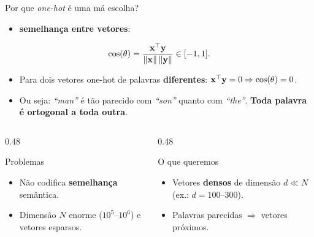 \begin{frame}{Por que \textit{one-hot} é uma má escolha?}
    \begin{itemize}
        \item \textbf{semelhança entre vetores}:
    \end{itemize}
    \begin{equation*}
        \cos(\theta) = \frac{\mathbf{x}^\top \mathbf{y}}{\|\mathbf{x}\|\,\|\mathbf{y}\|} \in [-1, 1].
    \end{equation*}
    \begin{itemize}
        \item Para dois vetores one-hot de palavras \textbf{diferentes}: $\mathbf{x}^\top\mathbf{y} = 0 \Rightarrow \cos(\theta) = 0$.
        \item Ou seja: \textit{``man''} é tão parecido com \textit{``son''} quanto com \textit{``the''}. \textbf{Toda palavra é ortogonal a toda outra}.
    \end{itemize}

    \begin{columns}[t]
        \begin{column}{0.48\textwidth}
            \begin{alertblock}{Problemas}
                \small
                \begin{itemize}
                    \item Não codifica \textbf{semelhança} semântica.
                    \item Dimensão $N$ enorme ($10^5$--$10^6$) e vetores esparsos.
                \end{itemize}
            \end{alertblock}
        \end{column}
        \begin{column}{0.48\textwidth}
            \begin{exampleblock}{O que queremos}
                \small
                \begin{itemize}
                    \item Vetores \textbf{densos} de dimensão $d \ll N$ (ex.: $d = 100$--$300$).
                    \item Palavras parecidas $\Rightarrow$ vetores próximos.
                \end{itemize}
            \end{exampleblock}
        \end{column}
    \end{columns}
\end{frame}


